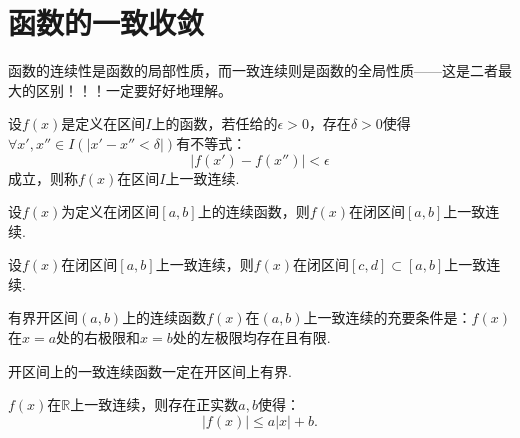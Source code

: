 \section{函数的一致收敛}

函数的连续性是函数的局部性质，而一致连续则是函数的全局性质——这是二者最大的区别！！！一定要好好地理解。

\begin{definition}
	设$f(x)$是定义在区间$I$上的函数，若任给的$\epsilon>0$，存在$\delta>0$使得$\forall x',x''\in I(|x'-x''<\delta|)$有不等式：
	\begin{equation}
		|f(x')-f(x'')|<\epsilon
	\end{equation}
	成立，则称$f(x)$在区间$I$上一致连续.
\end{definition}

\begin{theorem}[Cantor定理]
	设$f(x)$为定义在闭区间$[a,b]$上的连续函数，则$f(x)$在闭区间$[a,b]$上一致连续.
\end{theorem}

\begin{corollary}
	设$f(x)$在闭区间$[a,b]$上一致连续，则$f(x)$在闭区间$[c,d]\subset [a,b]$上一致连续.
\end{corollary}

\begin{proposition}
	有界开区间$(a,b)$上的连续函数$f(x)$在$(a,b)$上一致连续的充要条件是：$f(x)$在$x=a$处的右极限和$x=b$处的左极限均存在且有限.
\end{proposition}

\begin{corollary}
	开区间上的一致连续函数一定在开区间上有界.
\end{corollary}

\begin{proposition}
	$f(x)$在$\mathbb{R}$上一致连续，则存在正实数$a,b$使得：
	\begin{equation}
		|f(x)|\leq a|x|+b.
	\end{equation}
\end{proposition}